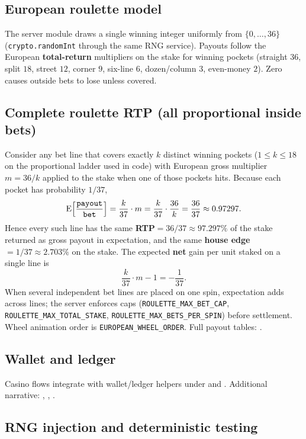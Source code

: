 \documentclass[11pt,a4paper]{article}
\begin{document}
\subsection{European roulette model}

The server module  draws a single winning integer uniformly from $\{0,\ldots,36\}$ (\texttt{crypto.randomInt} through the same RNG service). Payouts follow the European \textbf{total-return} multipliers on the stake for winning pockets (straight $36$, split $18$, street $12$, corner $9$, six-line $6$, dozen/column $3$, even-money $2$). Zero causes outside bets to lose unless covered.

\subsection{Complete roulette RTP (all proportional inside bets)}

Consider any bet line that covers exactly $k$ distinct winning pockets ($1\le k\le 18$ on the proportional ladder used in code) with European gross multiplier $m=36/k$ applied to the stake when one of those pockets hits. Because each pocket has probability $1/37$,
\[
\mathrm{E}\Bigl[\frac{\texttt{payout}}{\texttt{bet}}\Bigr]=\frac{k}{37}\cdot m=\frac{k}{37}\cdot\frac{36}{k}=\frac{36}{37}\approx 0.97297.
\]
Hence every such line has the same \textbf{RTP}${}=36/37\approx 97.297\%$ of the stake returned as gross payout in expectation, and the same \textbf{house edge}${}=1/37\approx 2.703\%$ on the stake. The expected \textbf{net} gain per unit staked on a single line is
\[
\frac{k}{37}\cdot m - 1 = -\frac{1}{37}.
\]
When several independent bet lines are placed on one spin, expectation adds across lines; the server enforces caps (\texttt{ROULETTE\_MAX\_BET\_CAP}, \texttt{ROULETTE\_MAX\_TOTAL\_STAKE}, \texttt{ROULETTE\_MAX\_BETS\_PER\_SPIN}) before settlement. Wheel animation order is \texttt{EUROPEAN\_WHEEL\_ORDER}. Full payout tables: .

\subsection{Wallet and ledger}

Casino flows integrate with wallet/ledger helpers under  and . Additional narrative: , , .

\subsection{RNG injection and deterministic testing}
\end{document}
